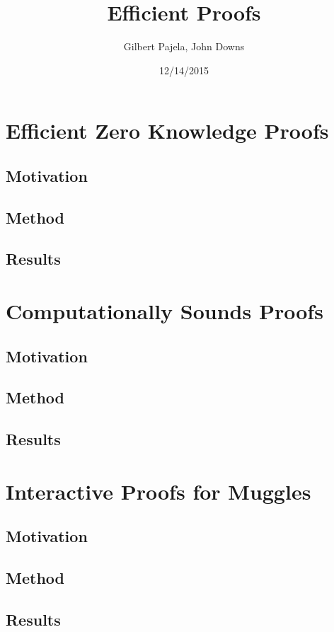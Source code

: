 \documentclass{article}
\title{Efficient Proofs}
\author{Gilbert Pajela, John Downs}
\date{12/14/2015}
\begin{document}
\maketitle

\section{Efficient Zero Knowledge Proofs}

\subsection{Motivation}
\subsection{Method}
\subsection{Results}

\section{Computationally Sounds Proofs}

\subsection{Motivation}
\subsection{Method}
\subsection{Results}


\section{Interactive Proofs for Muggles}

\subsection{Motivation}
\subsection{Method}
\subsection{Results}
\end{document}
